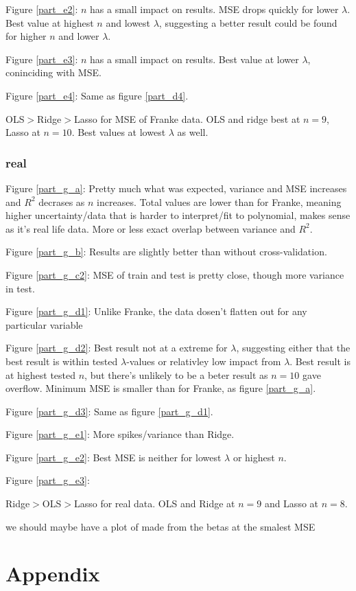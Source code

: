 \documentclass[a4paper,10pt,english]{article}
\begin{document}
Figure \ref{part_e2}: $n$ has a small impact on results. MSE drops quickly for lower $\lambda$. Best value at highest $n$ and lowest $\lambda$, suggesting a better result could be found for higher $n$ and lower $\lambda$.

Figure \ref{part_e3}: $n$ has a small impact on results. Best value at lower $\lambda$, coninciding with MSE. 

Figure \ref{part_e4}: Same as figure \ref{part_d4}.

OLS$>$Ridge$>$Lasso for MSE of Franke data. OLS and ridge best at $n=9$, Lasso at $n=10$. Best values at lowest $\lambda$ as well.


\subsubsection*{real}

Figure \ref{part_g_a}: Pretty much what was expected, variance and MSE increases and $R^2$ decrases as $n$ increases. Total values are lower than for Franke, meaning higher uncertainty/data that is harder to interpret/fit to polynomial, makes sense as it's real life data. More or less exact overlap between variance and $R^2$.

Figure \ref{part_g_b}: Results are slightly better than without cross-validation.

Figure \ref{part_g_c2}: MSE of train and test is pretty close, though more variance in test.

Figure \ref{part_g_d1}: Unlike Franke, the data dosen't flatten out for any particular variable

Figure \ref{part_g_d2}: Best result not at a extreme for $\lambda$, suggesting either that the best result is within tested $\lambda$-values or relativley low impact from $\lambda$. Best result is at highest tested $n$, but there's unlikely to be a beter result as $n=10$ gave overflow. Minimum MSE is smaller than for Franke, as figure \ref{part_g_a}. 

Figure \ref{part_g_d3}: Same as figure \ref{part_g_d1}.

Figure \ref{part_g_e1}: More spikes/variance than Ridge. 

Figure \ref{part_g_e2}: Best MSE is neither for lowest $\lambda$ or highest $n$.

Figure \ref{part_g_e3}: 

Ridge$>$OLS$>$Lasso for real data. OLS and Ridge at $n=9$ and Lasso at $n=8$.

we should maybe have a plot of made from the betas at the smalest MSE

\newpage

\section*{Appendix}
\label{sec:appendix}

{}

\end{document}
